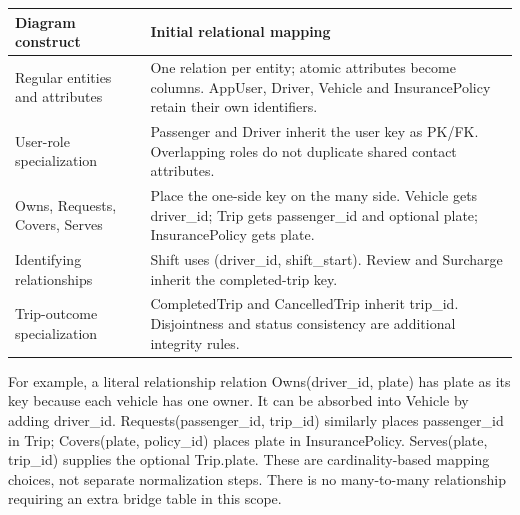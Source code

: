 \documentclass[11pt,a4paper]{article}
\begin{document}
\par\begingroup\small\noindent
\begin{tabularx}{\linewidth}{p{3.3cm}X}
\toprule
Diagram construct & Initial relational mapping\\\midrule
Regular entities and attributes & One relation per entity; atomic attributes become columns. AppUser, Driver, Vehicle and InsurancePolicy retain their own identifiers.\\
User-role specialization & Passenger and Driver inherit the user key as PK/FK. Overlapping roles do not duplicate shared contact attributes.\\
Owns, Requests, Covers, Serves & Place the one-side key on the many side. Vehicle gets driver\_\allowbreak{}id; Trip gets passenger\_\allowbreak{}id and optional plate; InsurancePolicy gets plate.\\
Identifying relationships & Shift uses (driver\_\allowbreak{}id, shift\_\allowbreak{}start). Review and Surcharge inherit the completed-trip key.\\
Trip-outcome specialization & CompletedTrip and CancelledTrip inherit trip\_\allowbreak{}id. Disjointness and status consistency are additional integrity rules.\\
\bottomrule
\end{tabularx}
\par\endgroup
For example, a literal relationship relation Owns(driver\_\allowbreak{}id, plate) has plate as its key because each vehicle has one owner. It can be absorbed into Vehicle by adding driver\_\allowbreak{}id. Requests(passenger\_\allowbreak{}id, trip\_\allowbreak{}id) similarly places passenger\_\allowbreak{}id in Trip; Covers(plate, policy\_\allowbreak{}id) places plate in InsurancePolicy. Serves(plate, trip\_\allowbreak{}id) supplies the optional Trip.plate. These are cardinality-based mapping choices, not separate normalization steps. There is no many-to-many relationship requiring an extra bridge table in this scope.

\clearpage
\end{document}
